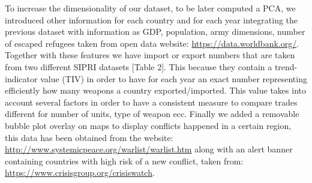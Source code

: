\documentclass{article}
\begin{document}
\begin{multicols}{2}
To increase the dimensionality of our dataset, to be later computed a PCA, we introduced other information for each country and for each year integrating the previous dataset with information as GDP, population, army dimensions, number of escaped refugees taken from open data website: \url{https://data.worldbank.org/}. 
Together with these features we have import or export numbers
that are taken from two different SIPRI datasets [Table 2]. This because they contain a trend-indicator value (TIV) in order to have for each year an exact number representing efficiently how many weapons a country exported/imported. This value takes into account several factors in order to have a consistent measure to compare trades different for number of units, type of weapon ecc.
Finally we added a removable bubble plot overlay on maps to display conflicts happened in a certain region, this data has been obtained from the website: \url{http://www.systemicpeace.org/warlist/warlist.htm} along with an alert banner containing countries with high risk of a new conflict, taken from:  \url{https://www.crisisgroup.org/crisiswatch}.  





\begin{center}
\begin{table}[ht]

\label{tab: d1}
\caption { \label { tab:d1} Attributes of dataset in \texttt{Trade-Register-1990-2018.csv} file.  }

\end{table}
\end{center}


\end{multicols}
\end{document}
